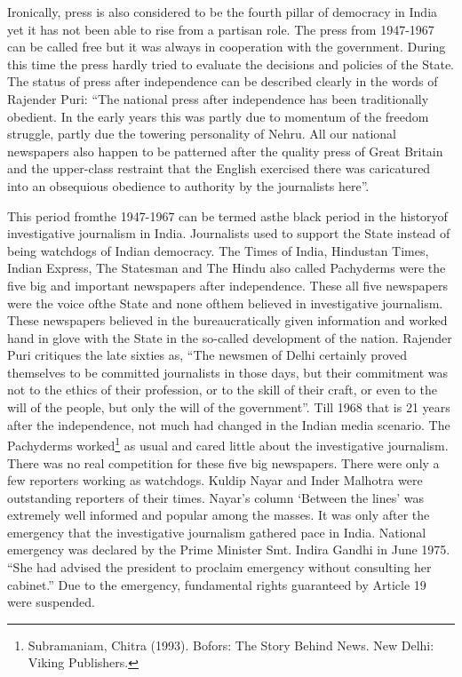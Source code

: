 \begin{multicols}{2}
\vspace{-.1cm}

\noi
Ironically, press is also considered to be the fourth pillar of democracy in India yet it has not
been able to rise from a partisan role. The press from 1947-1967 can be called free but it was
always in cooperation with the government. During this time the press hardly tried to evaluate the decisions and policies of the State. The status of press after independence can be described
clearly in the words of Rajender Puri: “The national press after independence has been
traditionally obedient. In the early years this was partly due to momentum of the freedom
struggle, partly due the towering personality of Nehru. All our national newspapers also happen
to be patterned after the quality press of Great Britain and the upper-class restraint that the
English exercised there was caricatured into an obsequious obedience to authority by the
journalists here”.

\vspace{-.1cm}

\noi
This period fromthe 1947-1967 can be termed asthe black period in the historyof investigative
journalism in India. Journalists used to support the State instead of being watchdogs of Indian
democracy. The Times of India, Hindustan Times, Indian Express, The Statesman and The
Hindu also called Pachyderms were the five big and important newspapers after independence.
These all five newspapers were the voice ofthe State and none ofthem believed in investigative
journalism. These newspapers believed in the bureaucratically given information and worked
hand in glove with the State in the so-called development of the nation. Rajender Puri critiques
the late sixties as, “The newsmen of Delhi certainly proved themselves to be committed
journalists in those days, but their commitment was not to the ethics of their profession, or to
the skill of their craft, or even to the will of the people, but only the will of the government”.
Till 1968 that is 21 years after the independence, not much had changed in the Indian media
scenario. The Pachyderms worked\footnote{Subramaniam, Chitra (1993). Bofors: The Story Behind News. New Delhi: Viking Publishers.} as usual and cared little about the investigative journalism.
There was no real competition for these five big newspapers. There were only a few reporters
working as watchdogs. Kuldip Nayar and Inder Malhotra were outstanding reporters of their
times. Nayar’s column ‘Between the lines’ was extremely well informed and popular among
the masses. It was only after the emergency that the investigative journalism gathered pace in
India. National emergency was declared by the Prime Minister Smt. Indira Gandhi in June
1975. “She had advised the president to proclaim emergency without consulting her cabinet.”
Due to the emergency, fundamental rights guaranteed by Article 19 were suspended.


\end{multicols}
